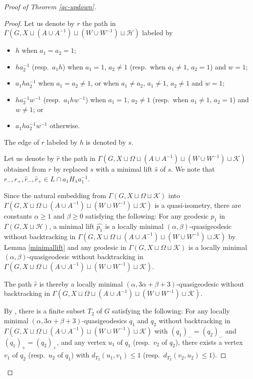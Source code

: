 \documentclass{amsart}
\theoremstyle{definition}
\begin{document}
\begin{proof}[Proof of Theorem \ref{qc-updown}]
\begin{proof}
Let us denote by $r$ the path in $\Gamma(G,X\sqcup (A \cup A^{-1})\sqcup (W \cup W^{-1})\sqcup {\mathcal H})$ labeled by
\begin{itemize}
\item $h$ when $a_{1}=a_{2}=1$; 
\item $ha_{2}^{-1}$ (resp.\ $a_{1} h$) when $a_{1}=1$, $a_{2}\ne 1$ (resp.\ when $a_{1} \ne 1$, $a_{2}=1$) and $w=1$;
\item $a_{1}h a_{2}^{-1}$ when $a_{1}=a_{2} \ne 1$, or when $a_{1} \ne a_{2}$, $a_{1}\ne 1$, $a_{2} \ne 1$ and $w=1$;
\item $ha_{2}^{-1}w^{-1}$ (resp.\ $a_{1} h w^{-1}$) when $a_{1}=1$, $a_{2}\ne 1$ (resp.\ when $a_{1}\ne 1$, $a_{2}=1$) and $w \ne 1$; or
\item $a_{1}h a_{2}^{-1}w^{-1}$ otherwise.
\end{itemize} 
The edge of $r$ labeled by $h$ is denoted by $s$. 

Let us denote by $\widehat r$ the path in $\Gamma(G,X\sqcup \Omega\sqcup (A \cup A^{-1})\sqcup (W \cup W^{-1}) \sqcup {\mathcal K})$ obtained from $r$ by replaced $s$ with a minimal lift $\widehat{s}$ of $s$. 
We note that $r_{-}, r_{+}, {\widehat r}_-, {\widehat r}_+ \in L\cap a_1H_\lambda a_1^{-1}$. 

Since the natural embedding from $\Gamma(G,X\sqcup\Omega\sqcup{\mathcal K})$ into $\Gamma(G,X\sqcup\Omega\sqcup (A \cup A^{-1})\sqcup (W \cup W^{-1}) \sqcup{\mathcal K})$ is a quasi-isometry, there are constants $\alpha\geq 1$ and $\beta\geq 0$ satisfying the following: 
For any geodesic $p_1$ in $\Gamma(G,X\sqcup{\mathcal H})$, a minimal lift $\widehat{p_1}$ is a locally minimal $(\alpha,\beta)$-quasigeodesic without backtracking in $\Gamma(G,X\sqcup\Omega\sqcup (A \cup A^{-1})\sqcup (W \cup W^{-1}) \sqcup {\mathcal K})$ by Lemma \ref{minimallift} and any geodesic in $\Gamma(G,X\sqcup\Omega\sqcup{\mathcal K})$ is a locally minimal $(\alpha,\beta)$-quasigeodesic without backtracking in $\Gamma(G,X\sqcup\Omega\sqcup (A \cup A^{-1})\sqcup (W \cup W^{-1}) \sqcup {\mathcal K})$. 

The path $\widehat r$ is thereby a locally minimal $(\alpha,3\alpha+\beta+3)$-quasigeodesic without backtracking in $\Gamma(G,X\sqcup\Omega\sqcup (A \cup A^{-1})\sqcup (W \cup W^{-1}) \sqcup {\mathcal K})$. 

By \cite[Theorem 2.14]{MP08}, there is a finite subset $T_2$ of $G$ satisfying the following: 
For any locally minimal $(\alpha,3\alpha+\beta+3)$-quasigeodesics $q_1$ and $q_2$ without backtracking in $\Gamma(G,X\sqcup\Omega\sqcup (A \cup A^{-1})\sqcup (W \cup W^{-1})\sqcup{\mathcal K})$ with $(q_1)_-=(q_2)_-$ and $(q_1)_+=(q_2)_+$, and any vertex $u_1$ of $q_1$ (resp.\ $v_2$ of $q_2$), there exists a vertex $v_1$ of $q_2$ (resp.\ $u_2$ of $q_1$) with $d_{T_2}(u_1,v_1)\leq 1$ (resp.\ $d_{T_2}(v_2,u_2)\leq 1$). 


\end{proof}
\end{proof}
\end{document}
